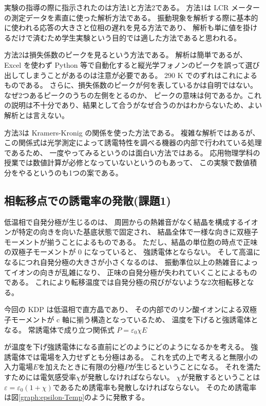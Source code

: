 \documentclass[9pt,dvipdfmx,a4paper]{jsarticle}
\begin{document}
実験の指導の際に指示されたのは方法1と方法2である。
方法1は LCR メーターの測定データを素直に使った解析方法である。
振動現象を解析する際に基本的に使われる応答の大きさと位相の遅れを見る方法であり、
解析も単に値を掛けるだけで済むため学生実験という目的では適した方法であると思われる。

方法2は損失係数のピークを見るという方法である。
解析は簡単であるが、
Excel を使わず Python 等で自動化すると縦光学フォノンのピークを誤って選び出してしまうことがあるのは注意が必要である。
290 K でのずれはこれによるものである。
さらに、損失係数のピークが何を表しているかは自明ではない。なぜ2つあるピークのうちの左側をとるのか、
ピークの意味は何であるか。これの説明は不十分であり、結果として合うがなぜ合うのかはわからないため、よい解析とは言えない。

方法3は Kramers-Kronig の関係を使った方法である。
複雑な解析ではあるが、この関係式は光学測定によって誘電特性を調べる機器の内部で行われている処理であるため、
一度やってみるというのは面白い方法ではある。
応用物理学科の授業では数値計算が必修となっていないというのもあって、
この実験で数値積分をやるというのも1つの案である。


\subsection{相転移点での誘電率の発散(課題1)}
低温相で自発分極が生じるのは、
周囲からの熱雑音がなく結晶を構成するイオンが特定の向きを向いた基底状態で固定され、
結晶全体で一様な向きに双極子モーメントが揃うことによるものである。
ただし、結晶の単位胞の時点で正味の双極子モーメントが 0 になっていると、
強誘電体とならない。
そして高温になるにつれ自発分極の大きさが小さくなるのは、
振動準位以上の熱雑音によってイオンの向きが乱雑になり、
正味の自発分極が失われていくことによるものである。
これにより転移温度では自発分極の飛びがないような2次相転移となる。

今回の KDP は低温相で直方晶であり、
その内部でのリン酸イオンによる双極子モーメントが c 軸に揃う構造となっているため、
温度を下げると強誘電体となる。
常誘電体で成り立つ関係式
\(P = \varepsilon_0 \chi E\)

が温度を下げ強誘電体になる直前にどのようにどのようになるかを考える。
強誘電体では電場を入力せずとも分極はある。
これを式の上で考えると無限小の入力電場\(E\)を加えたときに有限の分極\(P\)が生じるということになる。
それを満たすためには電気感受率\(\chi\)が発散しなければならない。
\(\chi\)が発散するということは\(\varepsilon = \varepsilon_0(1+\chi)\)であるため誘電率も発散しなければならない。
そのため誘電率は図\ref{graph:epsilon-Temp}のように発散する。
\end{document}
